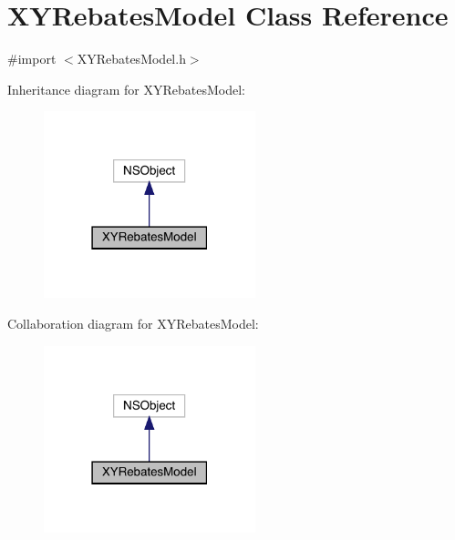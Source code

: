 \hypertarget{interface_x_y_rebates_model}{}\section{X\+Y\+Rebates\+Model Class Reference}
\label{interface_x_y_rebates_model}


{\ttfamily \#import $<$X\+Y\+Rebates\+Model.\+h$>$}



Inheritance diagram for X\+Y\+Rebates\+Model\+:\nopagebreak
\begin{figure}[H]
\begin{center}
\leavevmode
\includegraphics[width=174pt]{interface_x_y_rebates_model__inherit__graph}
\end{center}
\end{figure}


Collaboration diagram for X\+Y\+Rebates\+Model\+:\nopagebreak
\begin{figure}[H]
\begin{center}
\leavevmode
\includegraphics[width=174pt]{interface_x_y_rebates_model__coll__graph}
\end{center}
\end{figure}
